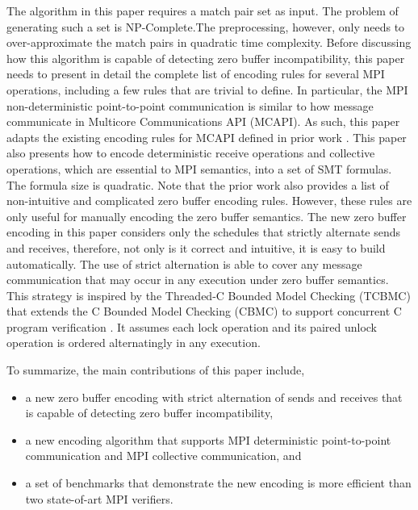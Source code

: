 The algorithm in this paper requires a match pair set as input. The problem of generating such a set is NP-Complete.The preprocessing, however, only needs to over-approximate the match pairs in quadratic time complexity. Before discussing how this algorithm is capable of detecting zero buffer incompatibility, this paper needs to present in detail the complete list of encoding rules for several MPI operations, including a few rules that are trivial to define.  In particular, the MPI non-deterministic point-to-point communication is similar to how message communicate in Multicore Communications API (MCAPI). As such, this paper adapts the existing encoding rules for MCAPI defined in prior work \cite{DBLP:conf/kbse/HuangMM13}. This paper also presents how to encode deterministic receive operations and collective operations, which are essential to MPI semantics, into a set of SMT formulas. The formula size is quadratic. Note that the prior work also provides a list of non-intuitive and complicated zero buffer encoding rules. However, these rules are only useful for manually encoding the zero buffer semantics. The new zero buffer encoding in this paper considers only the schedules that strictly alternate sends and receives, therefore, not only is it correct and intuitive, it is easy to build automatically. The use of strict alternation is able to cover any message communication that may occur in any execution under zero buffer semantics. This strategy is inspired by the Threaded-C Bounded Model Checking (TCBMC) that extends the C Bounded Model Checking (CBMC) \cite{DBLP:conf/tacas/ClarkeKL04,DBLP:conf/dac/ClarkeKY03} to support concurrent C program verification \cite{DBLP:conf/cav/RabinovitzG05}. It assumes each lock operation and its paired unlock operation is ordered alternatingly in any execution. 

To summarize, the main contributions of this paper include,
\begin{itemize}
\item a new zero buffer encoding with strict alternation of sends and receives that is capable of detecting zero buffer incompatibility, 
\item a new encoding algorithm that supports MPI deterministic point-to-point communication and MPI collective communication, and
\item a set of benchmarks that demonstrate the new encoding is more efficient than two state-of-art MPI verifiers.
\end{itemize}

